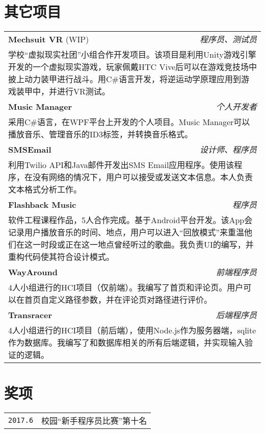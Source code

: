 \documentclass[UTF8]{ctexart}
\begin{document}
\section{其它项目}
\smallskip
\noindent
\begin{tabular}{l r}
\textbf{\large Mechsuit VR} {\small (WIP)} & \textit{程序员、测试员} \\
\multicolumn{2}{p{\linewidth}}{学校“虚拟现实社团”小组合作开发项目。该项目是利用Unity游戏引擎开发的一个虚拟现实游戏，玩家佩戴HTC Vive后可以在游戏竞技场中披上动力装甲进行战斗。用C\#语言开发，将逆运动学原理应用到游戏装甲中，并进行VR测试。} \\
\textbf{\large Music Manager} & \textit{个人开发者} \\
\multicolumn{2}{p{\linewidth}}{采用C\#语言，在WPF平台上开发的个人项目。Music Manager可以播放音乐、管理音乐的ID3标签，并转换音乐格式。} \\
\textbf{\large SMSEmail} & \textit{设计师、程序员} \\
\multicolumn{2}{p{\linewidth}}{利用Twilio API和Java邮件开发出SMS Email应用程序。使用该程序，在没有网络的情况下，用户可以接受或发送文本信息。本人负责文本格式分析工作。} \\
\textbf{\large Flashback Music} & \textit{程序员} \\
\multicolumn{2}{p{\linewidth}}{软件工程课程作品，5人合作完成。基于Android平台开发。该App会记录用户播放音乐的时间、地点，用户可以进入“回放模式”来重温他们在这一时段或正在这一地点曾经听过的歌曲。我负责UI的编写，并重构代码使其符合设计模式。} \\
\textbf{\large WayAround} & \textit{前端程序员} \\
\multicolumn{2}{p{\linewidth}}{4人小组进行的HCI项目（仅前端）。我编写了首页和评论页。用户可以在首页自定义路径参数，并在评论页对路径进行评价。} \\
\textbf{\large Transracer} & \textit{后端程序员} \\
\multicolumn{2}{p{\linewidth}}{4人小组进行的HCI项目（前后端），使用Node.js作为服务器端，sqlite作为数据库。我编写了和数据库相关的所有后端逻辑，并实现输入验证的逻辑。}
\end{tabular}

\smallskip

\section{奖项}
\smallskip
\noindent
\begin{tabularx}{\linewidth}{r | X}
\texttt{2017.6} & 校园“新手程序员比赛”第十名
\end{tabularx}
\end{document}
